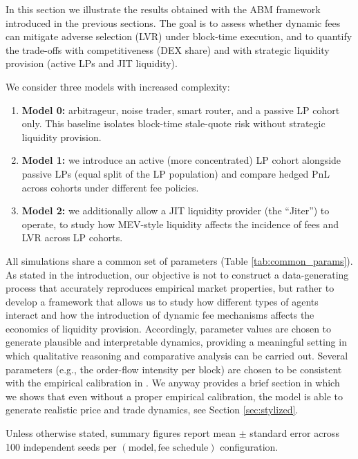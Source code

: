 \documentclass[11pt]{article}
\begin{document}
In this section we illustrate the results obtained with the ABM framework introduced in the previous sections. The goal 
is to assess whether dynamic fees can mitigate adverse selection (LVR) under block-time execution, and to quantify the 
trade-offs with competitiveness (DEX share) and with strategic liquidity provision (active LPs and JIT liquidity).

We consider three models with increased complexity:
\begin{enumerate}
    \item \textbf{Model 0:} arbitrageur, noise trader, smart router, and a passive LP cohort only. This baseline isolates 
    block-time stale-quote risk without strategic liquidity provision.
    \item \textbf{Model 1:} we introduce an active (more concentrated) LP cohort alongside passive LPs (equal split of 
    the LP population) and compare hedged PnL across cohorts under different fee policies.
    \item \textbf{Model 2:} we additionally allow a JIT liquidity provider (the ``Jiter'') to operate, to study how 
    MEV-style liquidity affects the incidence of fees and LVR across LP cohorts.
\end{enumerate}

All simulations share a common set of parameters (Table \ref{tab:common_params}). As stated in the introduction, 
our objective is not to construct a data-generating process that accurately reproduces empirical market properties, 
but rather to develop a framework that allows us to study how different types of agents interact and how the 
introduction of dynamic fee mechanisms affects the economics of liquidity provision. Accordingly, parameter values 
are chosen to generate plausible and interpretable dynamics, providing a meaningful setting in which qualitative 
reasoning and comparative analysis can be carried out. Several parameters (e.g., the order-flow intensity per block) 
are chosen to be consistent with the empirical calibration in \cite{dinosse_gatta}. We anyway provides a brief
section in which we shows that even without a proper empirical calibration, the model is able to generate realistic 
price and trade dynamics, see Section \ref{sec:stylized}.

Unless otherwise stated, summary figures report mean \(\pm\) standard error across 100 independent seeds per 
\((\text{model},\text{fee schedule})\) configuration.
\end{document}
